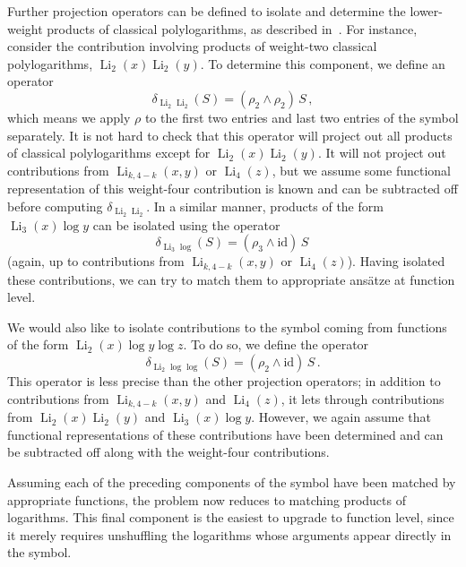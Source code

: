 \documentclass[11pt]{article}
\DeclareMathOperator{\Li}{Li}
\begin{document}
Further projection operators can be defined to isolate and determine the lower-weight products of classical polylogarithms, as described in~\cite{Goncharov:2010jf}. For instance, consider the contribution involving products of weight-two classical polylogarithms, $\Li_2(x) \Li_2(y)$. To determine this component, we define an operator
\begin{equation}
\delta_{\Li_2 \Li_2} (S)= (\rho_2 \wedge \rho_2)\, S \, , \label{eq:proj_op_1}
\end{equation}
which means we apply $\rho$ to the first two entries and last two entries of the symbol separately. It is not hard to check that this operator will project out all products of classical polylogarithms except for $\Li_2(x) \Li_2(y)$. It will not project out contributions from $\Li_{k,4-k}(x,y)$ or $\Li_4(z)$, but we assume some functional representation of this weight-four contribution is known and can be subtracted off before computing $\delta_{\Li_2 \Li_2}$. In a similar manner, products of the form $\Li_3(x) \log y$ can be isolated using the operator
\begin{equation}
\delta_{\Li_3 \log} (S)= (\rho_3 \wedge \text{id})\, S \,  \label{eq:proj_op_2} 
\end{equation}
(again, up to contributions from $\Li_{k,4-k}(x,y)$ or $\Li_4(z)$).  Having isolated these contributions, we can try to match them to appropriate ans{\"a}tze at function level.

We would also like to isolate contributions to the symbol coming from functions of the form $\Li_2(x) \log y  \log z$. To do so, we define the operator
\begin{equation}
\delta_{\Li_2 \log \log} (S)= (\rho_2 \wedge \text{id})\, S \, . \label{eq:proj_op_3}
\end{equation}
This operator is less precise than the other projection operators; in addition to contributions from $\Li_{k,4-k}(x,y)$ and $\Li_4(z)$, it lets through contributions from $\Li_2(x) \Li_2(y)$ and $\Li_3(x) \log y$. However, we again assume that functional representations of these contributions have been determined and can be subtracted off along with the weight-four contributions. 

Assuming each of the preceding components of the symbol have been matched by appropriate functions, the problem now reduces to matching products of logarithms. This final component is the easiest to upgrade to function level, since it merely requires unshuffling the logarithms whose arguments appear directly in the symbol.  
 
\end{document}
